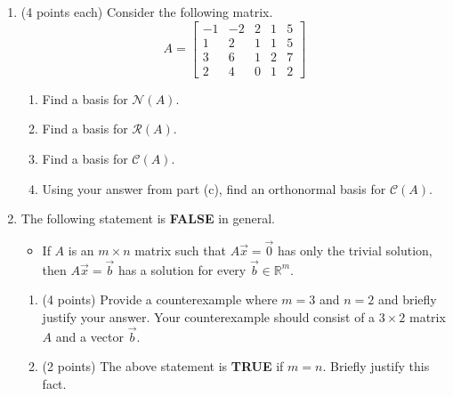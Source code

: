\documentclass[11pt]{article}
\theoremstyle{definition}
\begin{document}
\begin{enumerate}
\item (4 points each) Consider the following matrix.
	\[
	A = \begin{bmatrix}
	-1 & -2 & 2 & 1 & 5\\
	1 & 2 & 1 & 1 & 5\\
	3 & 6 & 1 & 2 & 7\\
	2 & 4 & 0 & 1 & 2
	\end{bmatrix}
	\]
\begin{enumerate}
\item Find a basis for $\mathcal{N}(A)$.

\item Find a basis for $\mathcal{R}(A)$.

\item Find a basis for $\mathcal{C}(A)$.

\item Using your answer from part (c), find an orthonormal basis for $\mathcal{C}(A)$.

\end{enumerate}

\newpage

%
%

\item The following statement is \textbf{FALSE} in general.
\begin{itemize}
\item[] If $A$ is an $m\times n$ matrix such that $A\vec{x}=\vec{0}$ has only the trivial solution, then $A\vec{x}=\vec{b}$ has a solution for every $\vec{b}\in\mathbb{R}^m$.
\end{itemize}

\begin{enumerate}
\item (4 points) Provide a counterexample where $m=3$ and $n=2$ and briefly justify your answer.  Your counterexample should consist of a $3 \times 2$ matrix $A$ and a vector $\vec{b}$.
    
\item (2 points) The above statement is \textbf{TRUE} if $m=n$.  Briefly justify this fact.


\end{enumerate}
\end{enumerate}
\end{document}
